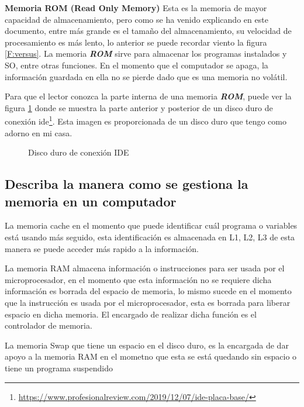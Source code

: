 \documentclass[12pt,letterpaper]{article}
\begin{document}
\textbf{Memoria ROM (Read Only Memory)} Esta es la memoria de mayor capacidad de almacenamiento, pero como se ha venido explicando en este documento, entre más grande es el tamaño del almacenamiento, su velocidad de procesamiento es más lento, lo anterior se puede recordar viento la figura \ref{F:versus}. La memoria \textbf{\textit{ROM}} sirve para almacenar los programas instalados y SO, entre otras funciones. En el momento que el computador se apaga, la información guardada en ella no se pierde dado que es una memoria no volátil.

Para que el lector conozca la parte interna de una memoria \textbf{\textit{ROM}}, puede ver la figura \ref{F:subfiguras} donde se muestra la parte anterior y posterior de un disco duro de conexión ide\footnote{\url{https://www.profesionalreview.com/2019/12/07/ide-placa-base/}}. Esta imagen es proporcionada de un disco duro que tengo como adorno en mi casa.

\begin{figure}[!ht]
    \centering
    \qquad

    \caption{Disco duro de conexión IDE}
    \label{F:subfiguras}
\end{figure}


        
\subsection{Describa la manera como se gestiona la memoria en un computador}
    La memoria cache en el momento que puede identificar cuál programa o variables está usando más seguido, esta identificación es almacenada en L1, L2, L3 de esta manera se puede acceder más rapido a la información.

    La memoria RAM almacena información o instrucciones para ser usada por el microprocesador, en el momento que esta información no se requiere dicha información es borrada del espacio de memoria, lo mismo sucede en el momento que la instrucción es usada por el microprocesador, esta es borrada para liberar espacio en dicha memoria. El encargado de realizar dicha función es el controlador de memoria.

    La memoria Swap que tiene un espacio en el disco duro, es la encargada de dar apoyo a la memoria RAM en el mometno que esta se está quedando sin espacio o tiene un programa suspendido
\end{document}
